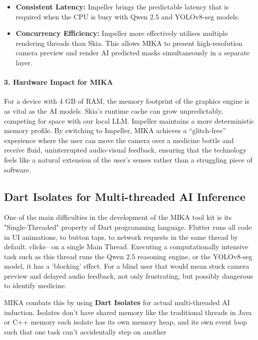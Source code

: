 \documentclass[12pt,a4paper]{report}
\begin{document}
\begin{itemize}
    \item \textbf{Consistent Latency:} Impeller brings the predictable latency that is required when the CPU is busy with Qwen 2.5 and YOLOv8-seg models.
    \item \textbf{Concurrency Efficiency:} Impeller more effectively utilises multiple rendering threads than Skia. This allows MIKA to present high-resolution camera preview and render AI predicted masks simultaneously in a separate layer.
\end{itemize}
 
\paragraph{3. Hardware Impact for MIKA}
For a device with 4 GB of RAM, the memory footprint of the graphics engine is as vital as the AI models. Skia's runtime cache can grow unpredictably, competing for space with our local LLM. Impeller maintains a more deterministic memory profile. By switching to Impeller, MIKA achieves a ``glitch-free'' experience where the user can move the camera over a medicine bottle and receive fluid, uninterrupted audio-visual feedback, ensuring that the technology feels like a natural extension of the user's senses rather than a struggling piece of software.
 
\subsection{Dart Isolates for Multi-threaded AI Inference}
 
One of the main difficulties in the development of the MIKA tool kit is its "Single-Threaded" property of Dart programming language. Flutter runs all code in UI animations, to button taps, to network requests in the same thread by default. clicks-- on a single Main Thread. Executing a computationally intensive task such as this thread runs the Qwen 2.5 reasoning engine, or the YOLOv8-seg model, it has a ‘blocking’ effect.  For a blind user that would mean stuck camera preview and delayed audio feedback, not only frustrating, but possibly dangerous to identify medicine. 
 
MIKA combats this by using \textbf{Dart Isolates} for actual multi-threaded AI induction.  Isolates don't have shared memory like the traditional threads in Java or C++ memory each isolate has its own memory heap, and its own event loop such that one task can’t accidentally step on another
\end{document}
